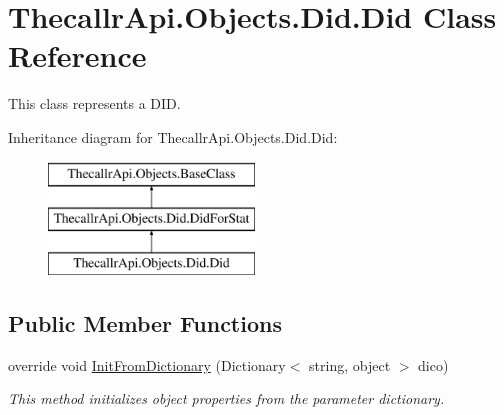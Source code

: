 \hypertarget{class_thecallr_api_1_1_objects_1_1_did_1_1_did}{\section{Thecallr\+Api.\+Objects.\+Did.\+Did Class Reference}
\label{class_thecallr_api_1_1_objects_1_1_did_1_1_did}
}


This class represents a D\+I\+D.  


Inheritance diagram for Thecallr\+Api.\+Objects.\+Did.\+Did\+:\begin{figure}[H]
\begin{center}
\leavevmode
\includegraphics[height=3.000000cm]{class_thecallr_api_1_1_objects_1_1_did_1_1_did}
\end{center}
\end{figure}
\subsection*{Public Member Functions}
\begin{DoxyCompactItemize}
\item 
override void \hyperlink{class_thecallr_api_1_1_objects_1_1_did_1_1_did_a8ebcd52fc677841a231e20c88e658fa5}{Init\+From\+Dictionary} (Dictionary$<$ string, object $>$ dico)
\begin{DoxyCompactList}\small\item\em This method initializes object properties from the parameter dictionary. \end{DoxyCompactList}\end{DoxyCompactItemize}
